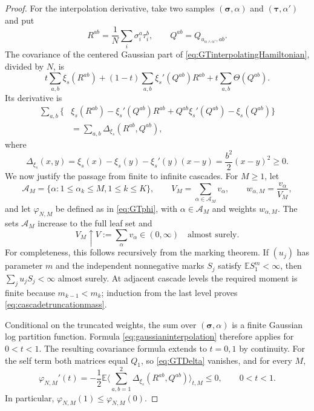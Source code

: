\documentclass[11pt]{article}
\numberwithin{equation}{section}
\theoremstyle{plain}
\theoremstyle{definition}
\newcommand{\E}{\mathbb E}
\newcommand{\1}{\mathbf 1}
\begin{document}
\begin{proof}
For the interpolation derivative, take two samples
$(\boldsymbol\sigma,\alpha)$ and
$(\boldsymbol\tau,\alpha')$ and put
\[
 R^{ab}=\frac1N\sum_i\sigma_i^a\tau_i^b,\qquad
 Q^{ab}=Q_{u_{\alpha\wedge\alpha'},ab}.
\]
The covariance of the centered Gaussian part of
\eqref{eq:GTinterpolatingHamiltonian}, divided by $N$, is
\[
 t\sum_{a,b}\xi_s(R^{ab})
 +(1-t)\sum_{a,b}\xi_s'(Q^{ab})R^{ab}
 +t\sum_{a,b}\Theta(Q^{ab}).
\]
Its derivative is
\begin{align}
 \sum_{a,b}\{&
 \xi_s(R^{ab})-\xi_s'(Q^{ab})R^{ab}
 +Q^{ab}\xi_s'(Q^{ab})-\xi_s(Q^{ab})\}\nonumber\\
 &=\sum_{a,b}\Delta_{\xi_s}(R^{ab},Q^{ab}),
 \label{eq:GTcovariancederivative}
\end{align}
where
\begin{equation}
 \Delta_{\xi_s}(x,y)
 =\xi_s(x)-\xi_s(y)-\xi_s'(y)(x-y)
 =\frac{b^2}{2}(x-y)^2\ge0.
 \label{eq:GTDelta}
\end{equation}
We now justify the passage from finite to infinite cascades.  For
$M\ge1$, let
\[
 \mathcal A_M=\{\alpha:1\le\alpha_k\le M, 1\le k\le K\},
 \qquad V_M=\sum_{\alpha\in\mathcal A_M}v_\alpha,
 \qquad w_{\alpha,M}=\frac{v_\alpha}{V_M},
\]
and let $\varphi_{N,M}$ be defined as in \eqref{eq:GTphi}, with
$\alpha\in\mathcal A_M$ and weights $w_{\alpha,M}$.  The sets
$\mathcal A_M$ increase to the full leaf set and
\begin{equation}
 V_M\uparrow V:=\sum_\alpha v_\alpha\in(0,\infty)
 \quad\text{almost surely}.
 \label{eq:cascadetruncationmass}
\end{equation}
For completeness, this follows recursively from the marking theorem.
If $(u_j)$ has parameter $m$ and the independent nonnegative marks
$S_j$ satisfy $\E S_1^m<\infty$, then $\sum_j u_jS_j<\infty$ almost
surely.  At adjacent cascade levels the required moment is finite
because $m_{k-1}<m_k$; induction from the last level proves
\eqref{eq:cascadetruncationmass}.

Conditional on the truncated weights, the sum over
$(\boldsymbol\sigma,\alpha)$ is a finite Gaussian log partition
function.  Formula \eqref{eq:gaussianinterpolation} therefore applies
for $0<t<1$.  The resulting covariance formula extends to $t=0,1$
by continuity.  For the self term both matrices equal $Q_1$, so
\eqref{eq:GTDelta} vanishes, and for every $M$,
\begin{equation}
 \varphi_{N,M}'(t)
 =-\frac12\E\Big\langle
 \sum_{a,b=1}^2\Delta_{\xi_s}(R^{ab},Q^{ab})
 \Big\rangle_{t,M}\le0,
 \qquad 0<t<1.
 \label{eq:GTderivative}
\end{equation}
In particular,
$\varphi_{N,M}(1)\le\varphi_{N,M}(0)$.


\end{proof}
\end{document}
